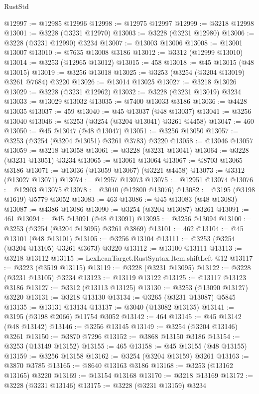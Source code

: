 \begin{lexlean}{RustStd}
\begin{coremodule}
{\begin{coremodule}
{{{{{{{{{{{{{{{{{{{{{{{{{{{{{{{{{{{{{@12997 := @12985 @12996
@12998 := @12975 @12997
@12999 := @3218 @12998
@13001 := @3228 (@3231 @12970)
@13003 := @3228 (@3231 @12980)
@13006 := @3228 (@3231 @12990) @3234
@13007 := @13003 @13006
@13008 := @13001 @13007
@13010 := @7635 @13008 @3186
@13012 := @3312 (@12999 @13010)
@13014 := @3253 (@12965 @13012)
@13015 := 458
@13018 := @45 @13015 (@48 @13015)
@13019 := @3256 @13018
@13025 := @3253 (@3254 (@3204 @13019) @3261 @7684) @3220
@13026 := @13014 @13025
@13027 := @3218 @13026
@13029 := @3228 (@3231 @12962)
@13032 := @3228 (@3231 @13019) @3234
@13033 := @13029 @13032
@13035 := @7400 @13033 @3186
@13036 := @4428 @13035
@13037 := 459
@13040 := @45 @13037 (@48 @13037)
@13041 := @3256 @13040
@13046 := @3253 (@3254 (@3204 @13041) @3261 @4458)
@13047 := 460
@13050 := @45 @13047 (@48 @13047)
@13051 := @3256 @13050
@13057 := @3253 (@3254 (@3204 @13051) @3261 @3783) @3220
@13058 := @13046 @13057
@13059 := @3218 @13058
@13061 := @3228 (@3231 @13041)
@13064 := @3228 (@3231 @13051) @3234
@13065 := @13061 @13064
@13067 := @8703 @13065 @3186
@13071 := @13036 (@13059 @13067) (@3221 @4458)
@13073 := @3312 (@13027 @13071)
@13074 := @12957 @13073
@13075 := @12951 @13074
@13076 := @12903 @13075
@13078 := @3040 (@12800 @13076)
@13082 := @3195 (@3198 @1619) @5779 @3052
@13083 := 463
@13086 := @45 @13083 (@48 @13083)
@13087 := @4386 @13086
@13090 := @3254 (@3204 @13087) @3261
@13091 := 461
@13094 := @45 @13091 (@48 @13091)
@13095 := @3256 @13094
@13100 := @3253 (@3254 (@3204 @13095) @3261 @3869)
@13101 := 462
@13104 := @45 @13101 (@48 @13101)
@13105 := @3256 @13104
@13111 := @3253 (@3254 (@3204 @13105) @3261 @3673) @3220
@13112 := @13100 @13111
@13113 := @3218 @13112
@13115 := LexLeanTarget.RustSyntax.Item.shiftLeft @12
@13117 := @3223 (@3519 @13115)
@13119 := @3228 (@3231 @13095)
@13122 := @3228 (@3231 @13105) @3234
@13123 := @13119 @13122
@13125 := @13117 @13123 @3186
@13127 := @3312 (@13113 @13125)
@13130 := @3253 (@13090 @13127) @3220
@13131 := @3218 @13130
@13134 := @3265 (@3231 @13087) @5845
@13135 := @13131 @13134
@13137 := @3040 (@13082 @13135)
@13141 := @3195 (@3198 @2066) @11754 @3052
@13142 := 464
@13145 := @45 @13142 (@48 @13142)
@13146 := @3256 @13145
@13149 := @3254 (@3204 @13146) @3261
@13150 := @3870 @7296
@13152 := @3868 @13150 @3186
@13154 := @3253 (@13149 @13152)
@13155 := 465
@13158 := @45 @13155 (@48 @13155)
@13159 := @3256 @13158
@13162 := @3254 (@3204 @13159) @3261
@13163 := @3870 @3785
@13165 := @8640 @13163 @3186
@13168 := @3253 (@13162 @13165) @3220
@13169 := @13154 @13168
@13170 := @3218 @13169
@13172 := @3228 (@3231 @13146)
@13175 := @3228 (@3231 @13159) @3234
}}}}}}}}}}}}}}}}}}}}}}}}}}}}}}}}}}}}}
\end{coremodule}}
\end{coremodule}
\end{lexlean}
